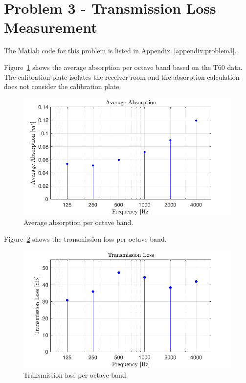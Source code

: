 {\newpage
\section*{Problem 3 - Transmission Loss Measurement}

The Matlab code for this problem is listed in Appendix~\ref{appendix:problem3}.

\vspace{0.25cm}
Figure~\ref{figure:q3AverageAbsorption} shows the average absorption per octave band based on the T60 data.  The calibration plate isolates the receiver room and the absorption calculation does not consider the calibration plate.


\begin{figure}[htb!]
    \center
        \includegraphics[scale = 1.0, keepaspectratio]{Q3 Average Absorption.pdf}
    \caption{Average absorption per octave band.}
    \label{figure:q3AverageAbsorption}
\end{figure}


\vspace{0.2cm}
Figure~\ref{figure:q3TransmissionLoss} shows the transmission loss per octave band.


\begin{figure}[htb!]
    \center
        \includegraphics[scale = 1.0, keepaspectratio]{Q3 Transmission Loss.pdf}
    \caption{Transmission loss per octave band.}
    \label{figure:q3TransmissionLoss}
\end{figure}






}
